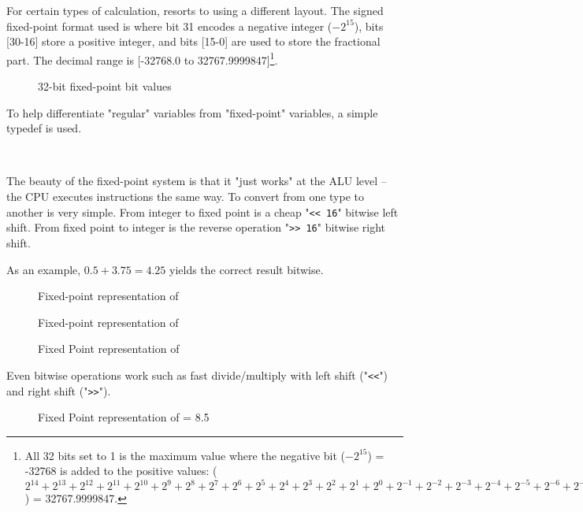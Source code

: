 For certain types of calculation, \doom{} resorts to using a different layout. The signed fixed-point format used is  where bit 31 encodes a negative integer ($-2^{15}$), bits [30-16] store a positive integer, and bits [15-0] are used to store the fractional part. The decimal range is [-32768.0 to 32767.9999847]\footnote{All 32 bits set to 1 is the maximum value where the negative bit ($-2^{15}$) = -32768 is added to the positive values:  
 ($2^{14} + 2^{13} + 2^{12} + 2^{11} + 2^{10} + 2^9 + 2^8 + 2^7 + 2^6 + 2^5 + 2^4 + 2^3 + 2^2 + 2^1 + 2^0 + 2^{-1} + 2^{-2}+ 2^{-3}+ 2^{-4}+ 2^{-5}+ 2^{-6}+ 2^{-7}+ 2^{-8}+ 2^{-9}+ 2^{-10}+ 2^{-11}+ 2^{-12}+ 2^{-13}+ 2^{-14}+ 2^{-15}+ 2^{-16}$) = 32767.9999847.}.\\
\par
\begin{figure}[H]
 \centering
  
  \caption{32-bit \doom{} fixed-point bit values}
\end{figure}
\par 
To help differentiate "regular" variables from "fixed-point" variables, a simple typedef  is used.\\
\par
{}\\
\par
The beauty of the fixed-point system is that it "just works" at the ALU level -- the CPU executes instructions the same way. To convert from one type to another is very simple. From integer to fixed point is a cheap "\verb!<< 16!" bitwise left shift. From fixed point to integer is the reverse operation "\verb|>> 16|" bitwise right shift.\\
\par


As an example, $0.5 + 3.75 = 4.25$ yields the correct result bitwise.\\
\par
\begin{figure}[H]
  \centering
  
  \caption{Fixed-point representation of }
\end{figure}
\begin{figure}[H]
  \centering
  
  \caption{Fixed-point representation of }
\end{figure}
\begin{figure}[H]
  \centering
  
  \caption{Fixed Point representation of }
\end{figure}
\par
Even bitwise operations work such as fast divide/multiply with left shift ("\verb!<<!") and right shift ("\verb|>>|").\\
\par
\begin{figure}[H]
  \centering
  
  \caption{Fixed Point representation of  = 8.5}
\end{figure}
\par

